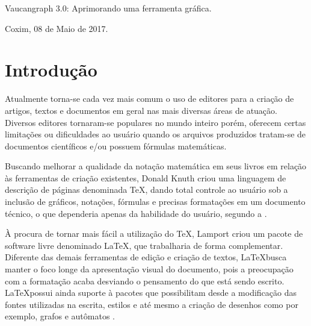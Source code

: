 \documentclass[a4paper,12pt,portuguese]{ufms-cpcx}
\begin{document}
\begin{center}
	
	\begin{minipage}[t]{10cm}
		\begin{center}
			\vspace{-2cm}
			{{\Large Vaucangraph 3.0: Aprimorando uma ferramenta gráfica.}}  
		\end{center}
	\end{minipage}
	
\end{center}

\vskip 3.0cm 

\begin{flushright}
	\vspace{12cm}
	Coxim, 08 de Maio de 2017.
\end{flushright}









\chapter{Introdução}
Atualmente torna-se cada vez mais comum o uso de editores para a criação de artigos, textos e documentos em geral nas mais diversas áreas de atuação. Diversos editores tornaram-se populares no mundo inteiro porém, oferecem certas limitações ou dificuldades ao usuário quando os arquivos produzidos tratam-se de documentos científicos e/ou possuem fórmulas  matemáticas.

Buscando melhorar a qualidade da notação matemática em seus livros em relação às ferramentas de criação existentes, Donald Knuth criou uma linguagem de descrição de páginas denominada \TeX, dando total controle ao usuário sob a inclusão de gráficos, notações, fórmulas e precisas formatações em um documento técnico, o que dependeria apenas da habilidade do usuário, segundo a \cite{BritannicaOnlineAcademicEditionT}.

 À procura de tornar mais fácil a utilização do \TeX, Lamport \cite{Lamport, L 1985} criou um pacote de software livre denominado \LaTeX, que trabalharia de forma complementar. Diferente das demais ferramentas de edição e criação de textos, \LaTeX busca manter o foco longe da apresentação visual do documento, pois a preocupação com a formatação acaba desviando o pensamento do que está sendo escrito. \LaTeX possui ainda suporte à pacotes que possibilitam desde a modificação das fontes utilizadas na escrita, estilos e até mesmo a criação de desenhos como por exemplo, grafos e autômatos \cite{BritannicaOnlineAcademicEditionL}.
 
\end{document}
